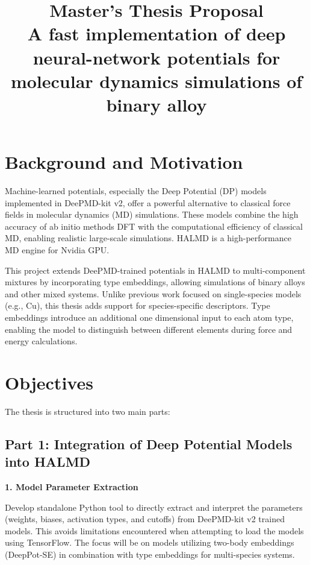 \documentclass[12pt]{article}
\title{\textbf{Master’s Thesis Proposal} \\
A fast implementation of deep neural-network potentials for molecular dynamics simulations of binary alloy}
\author{}
\date{}
\begin{document}
\maketitle

\section*{Background and Motivation}
Machine-learned potentials, especially the Deep Potential (DP) models implemented in DeePMD-kit v2, offer a powerful alternative to classical force fields in molecular dynamics (MD) simulations. These models combine the high accuracy of ab initio methods DFT with the computational efficiency of classical MD, enabling realistic large-scale simulations. HALMD is a high-performance MD engine for Nvidia GPU.

This project extends DeePMD-trained potentials in HALMD to multi-component mixtures by incorporating type embeddings, allowing simulations of binary alloys and other mixed systems. Unlike previous work focused on single-species models (e.g., Cu), this thesis adds support for species-specific descriptors. Type embeddings introduce an additional one dimensional input to each atom type, enabling the model to distinguish between different elements during force and energy calculations.



\section*{Objectives}
The thesis is structured into two main parts:

\subsection*{Part 1: Integration of Deep Potential Models into HALMD}
\textbf{1. Model Parameter Extraction}

Develop standalone Python tool to directly extract and interpret the parameters (weights, biases, activation types, and cutoffs) from DeePMD-kit v2 trained models. This avoids limitations encountered when attempting to load the models using TensorFlow. The focus will be on models utilizing two-body embeddings (DeepPot-SE) in combination with type embeddings for multi-species systems.
\end{document}
